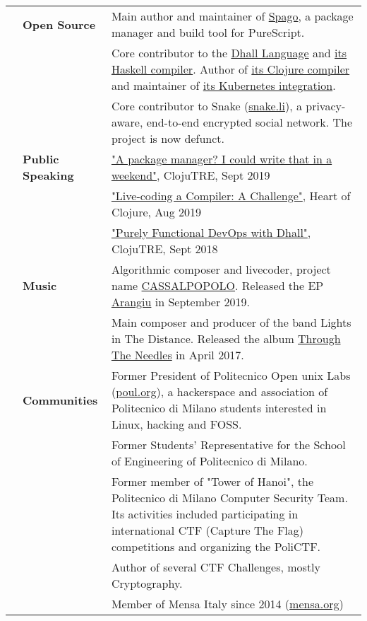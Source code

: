 \documentclass[a4paper,10pt]{article}
\newcommand{\vvv}{\vspace{4 mm}}
\begin{document}
\noindent
\large
\begin{tabularx}{\textwidth}{ C{0.0cm} L{3.25cm} *{1}{X}}
  & \textbf{Open Source}
  & Main author and maintainer of \href{https://github.com/spacchetti/spago}{Spago}, a package manager and build tool for PureScript. \vvv\\
  & & Core contributor to the \href{https://github.com/dhall-lang/dhall-lang}{Dhall Language} and \href{https://github.com/dhall-lang/dhall-haskell}{its Haskell compiler}. Author of \href{https://github.com/f-f/dhall-clj}{its Clojure compiler} and maintainer of \href{https://github.com/dhall-lang/dhall-kubernetes}{its Kubernetes integration}. \vvv\\
  & & Core contributor to Snake (\href{https://snake.li}{snake.li}), a privacy-aware, end-to-end encrypted social network. The project is now defunct. \vvv\\

  & \textbf{Public Speaking}
  & \href{https://www.youtube.com/watch?v=kPuGS4_9mRc}{"A package manager? I could write that in a weekend"}, ClojuTRE, Sept 2019\vvv\\
  & & \href{https://www.youtube.com/watch?v=_lMltUNB6Yw}{"Live-coding a Compiler: A Challenge"}, Heart of Clojure, Aug 2019\vvv\\
  & & \href{https://www.youtube.com/watch?v=UHp6nEF5m2o}{"Purely Functional DevOps with Dhall"}, ClojuTRE, Sept 2018\vvv\\

  & \textbf{Music}
  & Algorithmic composer and livecoder, project name \href{https://github.com/f-f/CASSALPOPOLO}{CASSALPOPOLO}. Released the EP \href{https://soundcloud.com/cassalpopolo/sets/arangiu}{Arangiu} in September 2019. \vvv\\
  & & Main composer and producer of the band Lights in The Distance. Released the album \href{https://lightsinthedistance.bandcamp.com/releases}{Through The Needles} in April 2017. \vvv\\

  & \textbf{Communities}
  & Former President of Politecnico Open unix Labs (\href{https://poul.org}{poul.org}), a hackerspace and association of Politecnico di Milano students interested in Linux, hacking and FOSS. \vvv\\
  & & Former Students' Representative for the School of Engineering of Politecnico di Milano. \vvv\\
  & & Former member of "Tower of Hanoi", the Politecnico di Milano Computer Security Team. Its activities included participating in international CTF (Capture The Flag) competitions and organizing the PoliCTF.\\ & & Author of several CTF Challenges, mostly Cryptography. \vvv\\
  & & Member of Mensa Italy since 2014 (\href{https://mensa.org}{mensa.org}) \vvv\\
\end{tabularx}
\end{document}
